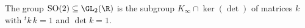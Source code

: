 The group $\mathrm{SO}(2)\subseteq\GL_2(\R)$ is the subgroup $K_\infty\cap\ker(\det)$ of matrices $k$ with ${}^tk\,k=1$ and $\det k=1$.
